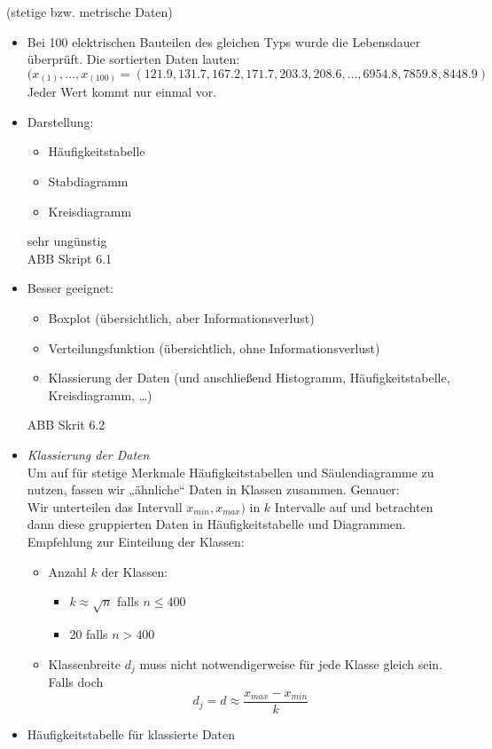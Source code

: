  (stetige bzw. metrische Daten)
\begin{itemize}
\item Bei 100 elektrischen Bauteilen des gleichen Typs wurde die Lebensdauer überprüft. Die sortierten Daten lauten:
$$(x_{(1)}, \ldots, x_{(100)} = (121.9,131.7,167.2,171.7,203.3,208.6,\ldots,6954.8,7859.8,8448.9)$$
Jeder Wert kommt nur einmal vor.
\item Darstellung:
\begin{itemize}
\item Häufigkeitstabelle
\item Stabdiagramm
\item Kreisdiagramm
\end{itemize}
sehr ungünstig\\
ABB Skript 6.1
\item Besser geeignet:
\begin{itemize}
\item Boxplot (übersichtlich, aber Informationsverlust)
\item Verteilungsfunktion (übersichtlich, ohne Informationsverlust)
\item Klassierung der Daten (und anschließend Histogramm, Häufigkeitstabelle, Kreisdiagramm, …)
\end{itemize}
ABB Skrit 6.2
\item \emph{Klassierung der Daten}\\
Um auf für stetige Merkmale Häufigkeitstabellen und Säulendiagramme zu nutzen, fassen wir „ähnliche“ Daten in Klassen zusammen. Genauer:\\
Wir unterteilen das Intervall $x_{min},x_{max})$ in $k$ Intervalle auf und betrachten dann diese gruppierten Daten in Häufigkeitstabelle und Diagrammen.\\
Empfehlung zur Einteilung der Klassen:
\begin{itemize}
\item Anzahl $k$ der Klassen:
\begin{itemize}
\item $k \approx \sqrt{n}$ falls $n\leq 400$
\item $20$ falls $n > 400$
\end{itemize}
\item Klassenbreite $d_j$ muss nicht notwendigerweise für jede Klasse gleich sein. Falls doch
$$d_j = d \approx \frac{x_{max}-x_{min}}{k}$$
\end{itemize}
\item Häufigkeitstabelle für klassierte Daten\\

\end{itemize}
